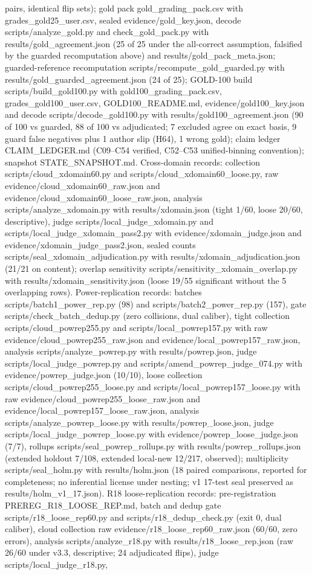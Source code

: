 \documentclass[10pt]{article} %
\begin{document}
pairs, identical flip sets); gold pack gold\_grading\_pack.csv with grades\_gold25\_user.csv, sealed evidence/gold\_key.json, decode scripts/analyze\_gold.py and check\_gold\_pack.py with results/gold\_agreement.json (25 of 25 under the all-correct assumption, falsified by the guarded recomputation above) and results/gold\_pack\_meta.json; guarded-reference recomputation scripts/recompute\_gold\_guarded.py with results/gold\_guarded\_agreement.json (24 of 25); GOLD-100 build scripts/build\_gold100.py with gold100\_grading\_pack.csv, grades\_gold100\_user.csv, GOLD100\_README.md, evidence/gold100\_key.json and decode scripts/decode\_gold100.py with results/gold100\_agreement.json (90 of 100 vs guarded, 88 of 100 vs adjudicated; 7 excluded agree on exact basis, 9 guard false negatives plus 1 author slip (H64), 1 wrong gold); claim ledger CLAIM\_LEDGER.md (C09--C54 verified, C52--C53 unified-binning convention); snapshot STATE\_SNAPSHOT.md. Cross-domain records: collection scripts/cloud\_xdomain60.py and scripts/cloud\_xdomain60\_loose.py, raw evidence/cloud\_xdomain60\_raw.json and evidence/cloud\_xdomain60\_loose\_raw.json, analysis scripts/analyze\_xdomain.py with results/xdomain.json (tight 1/60, loose 20/60, descriptive), judge scripts/local\_judge\_xdomain.py and scripts/local\_judge\_xdomain\_pass2.py with evidence/xdomain\_judge.json and evidence/xdomain\_judge\_pass2.json, sealed counts scripts/seal\_xdomain\_adjudication.py with results/xdomain\_adjudication.json (21/21 on content); overlap sensitivity scripts/sensitivity\_xdomain\_overlap.py with results/xdomain\_sensitivity.json (loose 19/55 significant without the 5 overlapping rows). Power-replication records: batches scripts/batch1\_power\_rep.py (98) and scripts/batch2\_power\_rep.py (157), gate scripts/check\_batch\_dedup.py (zero collisions, dual caliber), tight collection scripts/cloud\_powrep255.py and scripts/local\_powrep157.py with raw evidence/cloud\_powrep255\_raw.json and evidence/local\_powrep157\_raw.json, analysis scripts/analyze\_powrep.py with results/powrep.json, judge scripts/local\_judge\_powrep.py and scripts/amend\_powrep\_judge\_074.py with evidence/powrep\_judge.json (10/10), loose collection scripts/cloud\_powrep255\_loose.py and scripts/local\_powrep157\_loose.py with raw evidence/cloud\_powrep255\_loose\_raw.json and evidence/local\_powrep157\_loose\_raw.json, analysis scripts/analyze\_powrep\_loose.py with results/powrep\_loose.json, judge scripts/local\_judge\_powrep\_loose.py with evidence/powrep\_loose\_judge.json (7/7), rollups scripts/seal\_powrep\_rollups.py with results/powrep\_rollups.json (extended holdout 7/108, extended local-new 12/217, observed); multiplicity scripts/seal\_holm.py with results/holm.json (18 paired comparisons, reported for completeness; no inferential license under nesting; v1 17-test seal preserved as results/holm\_v1\_17.json). R18 loose-replication records: pre-registration PREREG\_R18\_LOOSE\_REP.md, batch and dedup gate scripts/r18\_loose\_rep60.py and scripts/r18\_dedup\_check.py (exit 0, dual caliber), cloud collection raw evidence/r18\_loose\_rep60\_raw.json (60/60, zero errors), analysis scripts/analyze\_r18.py with results/r18\_loose\_rep.json (raw 26/60 under v3.3, descriptive; 24 adjudicated flips), judge scripts/local\_judge\_r18.py, 
\end{document}
